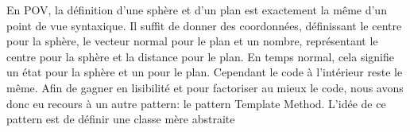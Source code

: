\documentclass[../../Rapport RayTracer]{subfiles}
\begin{document}
En POV, la définition d'une sphère et d'un plan est exactement la même d'un point de vue syntaxique. Il suffit de donner des coordonnées, définissant le centre pour la sphère, le vecteur normal pour le plan et un nombre, représentant le centre pour la sphère et la distance pour le plan. En temps normal, cela signifie un état pour la sphère et un pour le plan. Cependant le code à l'intérieur reste le même.
Afin de gagner en lisibilité et pour factoriser au mieux le code, nous avons donc eu recours à un autre pattern: le pattern Template Method. L'idée de ce pattern est de définir une classe mère abstraite
\end{document}
